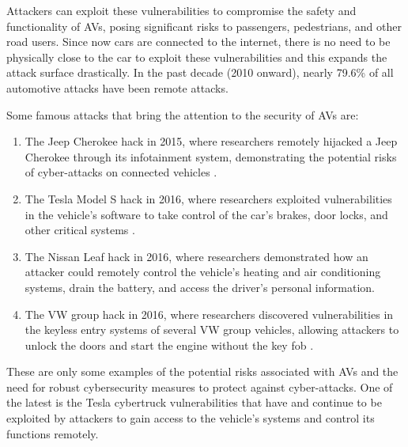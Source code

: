 Attackers can exploit these vulnerabilities to compromise the safety and functionality of AVs, posing significant risks to passengers, pedestrians, and other road users.
Since now cars are connected to the internet, there is no need to be physically close to the car to exploit these vulnerabilities and this expands the attack surface drastically.
In the past decade (2010 onward), nearly 79.6\% of all automotive attacks have been
remote attacks.

Some famous attacks that bring the attention to the security of AVs are:
\begin{enumerate}
    \item The Jeep Cherokee hack in 2015, where researchers remotely hijacked a Jeep Cherokee through its infotainment system, demonstrating the potential risks of cyber-attacks on connected vehicles \cite{miller2015remote} .
    \item The Tesla Model S hack in 2016, where researchers exploited vulnerabilities in the vehicle's software to take control of the car's brakes, door locks, and other critical systems \cite{tesla_hack}.
    \item The Nissan Leaf hack in 2016, where researchers demonstrated how an attacker could remotely control the vehicle's heating and air conditioning systems, drain the battery, and access the driver's personal information.
    \item The VW group hack in 2016, where researchers discovered vulnerabilities in the keyless entry systems of several VW group vehicles, allowing attackers to unlock the doors and start the engine without the key fob \cite{garcia2016lock}.
\end{enumerate}

These are only some examples of the potential risks associated with AVs and the need for robust cybersecurity measures to protect against cyber-attacks.
One of the latest is the Tesla cybertruck vulnerabilities that have and continue to be exploited by attackers to gain access to the vehicle's systems and control its functions remotely.



























